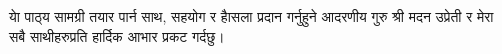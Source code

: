 \begin{titlepage}
\newpage
\vspace*{\fill}
\thispagestyle{empty}

\newpage
\vspace*{\fill}
\thispagestyle{empty}
\begin{center}
	\begin{nepali}
		{\large {याे पाठ्‍य सामग्री तयार पार्न साथ, सहयोग र हाैसला प्रदान गर्नुहुने आदरणीय गुरु श्री मदन उप्रेती र मेरा सबै साथीहरुप्रति हार्दिक आभार प्रकट गर्दछु।}}
	\end{nepali}
\end{center}
\vspace*{\fill}

\end{titlepage}